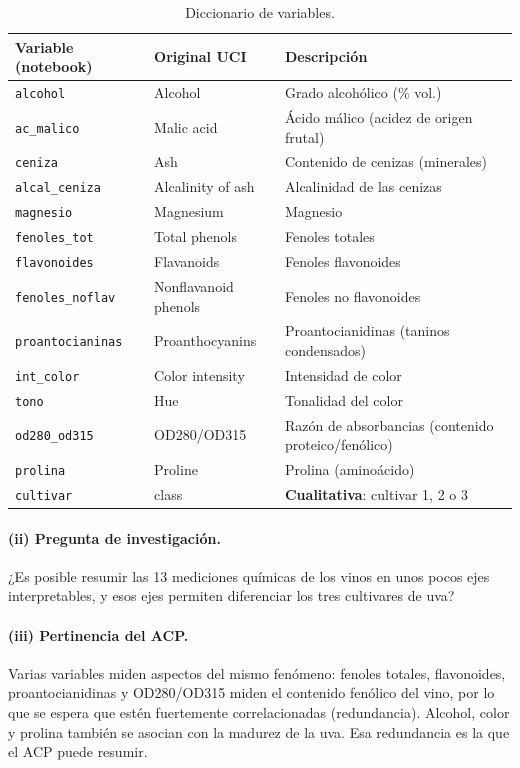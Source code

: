 \documentclass[11pt,a4paper]{article}
\newcommand{\var}[1]{\texttt{#1}}
\begin{document}
\begin{table}[H]
\centering\small
\caption{Diccionario de variables.}
\begin{tabular}{lll}
\toprule
Variable (notebook) & Original UCI & Descripción \\
\midrule
\var{alcohol} & Alcohol & Grado alcohólico (\% vol.) \\
\var{ac\_malico} & Malic acid & Ácido málico (acidez de origen frutal) \\
\var{ceniza} & Ash & Contenido de cenizas (minerales) \\
\var{alcal\_ceniza} & Alcalinity of ash & Alcalinidad de las cenizas \\
\var{magnesio} & Magnesium & Magnesio \\
\var{fenoles\_tot} & Total phenols & Fenoles totales \\
\var{flavonoides} & Flavanoids & Fenoles flavonoides \\
\var{fenoles\_noflav} & Nonflavanoid phenols & Fenoles no flavonoides \\
\var{proantocianinas} & Proanthocyanins & Proantocianidinas (taninos condensados) \\
\var{int\_color} & Color intensity & Intensidad de color \\
\var{tono} & Hue & Tonalidad del color \\
\var{od280\_od315} & OD280/OD315 & Razón de absorbancias (contenido proteico/fenólico) \\
\var{prolina} & Proline & Prolina (aminoácido) \\
\var{cultivar} & class & \textbf{Cualitativa}: cultivar 1, 2 o 3 \\
\bottomrule
\end{tabular}
\end{table}

\paragraph{(ii) Pregunta de investigación.} ¿Es posible resumir las 13 mediciones químicas de los vinos en unos pocos ejes interpretables, y esos ejes permiten diferenciar los tres cultivares de uva?

\paragraph{(iii) Pertinencia del ACP.} Varias variables miden aspectos del mismo fenómeno: fenoles totales, flavonoides, proantocianidinas y OD280/OD315 miden el contenido fenólico del vino, por lo que se espera que estén fuertemente correlacionadas (redundancia). Alcohol, color y prolina también se asocian con la madurez de la uva. Esa redundancia es la que el ACP puede resumir.
\end{document}
